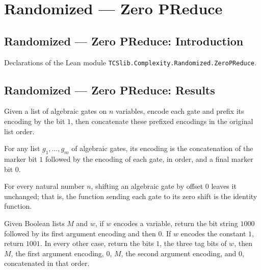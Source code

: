 \section{Randomized --- Zero PReduce}
\subsection*{Randomized --- Zero PReduce: Introduction}

Declarations of the Lean module \texttt{TCSlib.Complexity.Randomized.ZeroPReduce}.

\subsection*{Randomized --- Zero PReduce: Results}

\begin{definition}
\label{Randomized.PIT.gatesBody}
\leanok
{}
Given a list of algebraic gates on $n$ variables, encode each gate and prefix its
encoding by the bit $1$, then concatenate these prefixed encodings in the original list
order.
\end{definition}

\begin{theorem}
\label{Randomized.PIT.encodeGates_eq}
\leanok
{}
For any list $g_1,\ldots,g_m$ of algebraic gates, its encoding is the concatenation of
the marker bit $1$ followed by the encoding of each gate, in order, and a final marker
bit $0$.
\end{theorem}

\begin{theorem}
\label{Randomized.AlgGate.shift_zero}
\leanok
{}
For every natural number $n$, shifting an algebraic gate by offset $0$ leaves it
unchanged; that is, the function sending each gate to its zero shift is the identity
function.
\end{theorem}

\begin{definition}
\label{Randomized.PIT.shiftGateW}
\leanok
{}
Given Boolean lists $M$ and $w$, if $w$ encodes a variable, return the bit string $1000$
followed by its first argument encoding and then $0$. If $w$ encodes the constant $1$,
return $1001$. In every other case, return the bits $1$, the three tag bits of $w$, then
$M$, the first argument encoding, $0$, $M$, the second argument encoding, and $0$,
concatenated in that order.
\end{definition}

